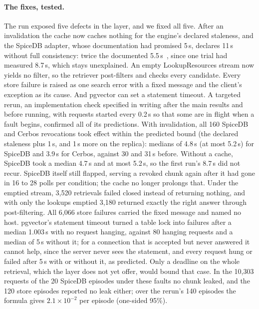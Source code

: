 \paragraph{The fixes, tested.}
The run exposed five defects in the layer, and we fixed all five. After an invalidation the cache
now caches nothing for the engine's declared staleness, and the SpiceDB adapter, whose documentation
had promised 5\,s, declares 11\,s without full consistency: twice the documented
5.5\,s~\cite{authzed2026reference}, since one trial had
measured 8.7\,s, which stays unexplained. An empty LookupResources stream now yields no filter, so the retriever post-filters
and checks every candidate. Every store failure is raised as one search error with a fixed message
and the client's exception as its cause. And pgvector can set a statement timeout. A targeted rerun,
an implementation check specified in writing after the main results and before running,
with requests started every 0.2\,s so that some are in flight when a
fault begins, confirmed all of its predictions. With invalidation, all 160 SpiceDB and Cerbos
revocations took effect within the predicted bound (the declared staleness plus 1\,s, and 1\,s more
on the replica): medians of
4.8\,s (at most 5.2\,s) for SpiceDB and 3.9\,s for Cerbos, against 30 and 31\,s before. Without a
cache, SpiceDB took a median 4.7\,s and at most 5.2\,s, so the first run's 8.7\,s did not recur. SpiceDB itself
still flapped, serving a revoked chunk again after it had gone in 16 to 28 polls per condition; the
cache no longer prolongs that. Under the emptied stream, 3,520 retrievals failed closed instead of
returning nothing, and with only the lookups emptied 3,180 returned exactly the right answer through
post-filtering. All 6,066 store failures carried the fixed message and named no host. pgvector's
statement timeout turned a table lock into failures after a median 1.003\,s with no request hanging,
against 80 hanging requests and a median of 5\,s without it; for a connection that is accepted but never answered it cannot
help, since the server never sees the statement, and every request hung or failed after 5\,s with or
without it, as predicted. Only a deadline on the whole retrieval, which the layer does not yet offer,
would bound that case. In the 10,303 requests of the 20 SpiceDB episodes under these faults no chunk leaked, and the 120 store episodes reported no leak either; over the rerun's 140
episodes the formula gives $2.1 \times 10^{-2}$ per episode (one-sided 95\%).
